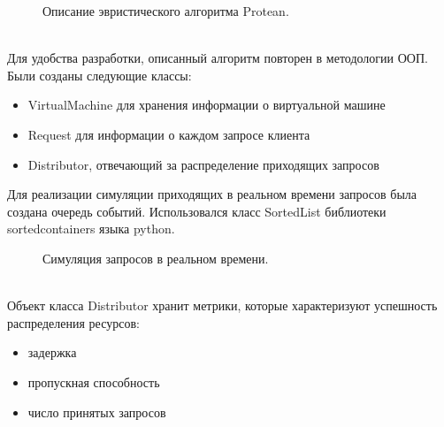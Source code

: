 \documentclass{article}
\begin{document}
\begin{figure}[h]
\caption{Описание эвристического алгоритма Protean\cite{litlink21}.}
\label{ris:image}
\end{figure}\\
Для удобства разработки, описанный алгоритм повторен в методологии ООП. Были созданы следующие классы: 
\begin{itemize}
\item VirtualMachine для хранения информации о виртуальной машине
\item Request для информации о каждом запросе клиента
\item Distributor, отвечающий за распределение приходящих запросов
\end{itemize}
Для реализации симуляции приходящих в реальном времени запросов была создана очередь событий. Использовался класс SortedList библиотеки sortedcontainers языка python. 
\begin{figure}[h!]
\caption{Симуляция запросов в реальном времени.}
\label{ris:image}
\end{figure}\\
Объект класса Distributor хранит метрики, которые характеризуют успешность распределения ресурсов:
\begin{itemize}
\item задержка
\item пропускная способность
\item число принятых запросов 
\end{itemize}
\end{document}
